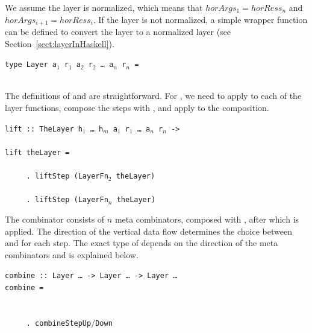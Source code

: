 \documentclass[preprint,natbib]{sigplanconf}
\begin{document}
We assume the layer is normalized, which means that $horArgs_{1} = horRess_n$ and 
$horArgs_{i+1} = horRess_i$. If the layer is not normalized, a simple wrapper function can be defined to convert the layer to a normalized layer (see Section~\ref{sect:layerInHaskell}).


\begin{small}
\begin{tabbing}
{\tt ty}\={\tt pe Layer a$_1$ r$_1$ a$_2$ r$_2$ \dots ~a$_n$ r$_n$ =}\\
        \\
\end{tabbing}
\end{small}


 

The definitions of  and  are straightforward. For , we need to apply  to each of the layer functions, compose the steps with , and apply  to the composition. 

\begin{small}
\begin{tabbing}
{\tt lift}\verb| :: |\={\tt TheLayer h$_1$ \dots ~h$_m$ a$_1$ r$_1$ \dots ~a$_n$ r$_n$ ->}\\
                     \\
{\tt li}\={\tt ft t}\={\tt heLayer = }\\
\\
\>\verb|     . lift|{\tt Step (LayerFn$_2$ theLayer)}\\
\>{\tt ~~~~~\dots}\\ 
\>\verb|     . lift|{\tt Step (LayerFn$_n$ theLayer)}
\end{tabbing}
\end{small}%


The  combinator consists of $n$  meta combinators, composed with , after which  is applied. The direction of the vertical data flow determines the choice between  and  for each step.  The exact type of  depends on the direction of the meta combinators and is explained below. 

\begin{small}
\begin{tabbing}
{\tt combine}\verb| :: |{\tt Layer \dots}\verb| -> |{\tt Layer \dots}\verb| -> |{\tt Layer \dots }\\
{\tt co}\={\tt mbine}\={\tt ~= }\\
\\
\>{\tt ~~~~~\dots}\\ 
\>\verb|     . combine|{\tt StepUp$/$Down}\\
\end{tabbing}%
\end{small}
\end{document}

